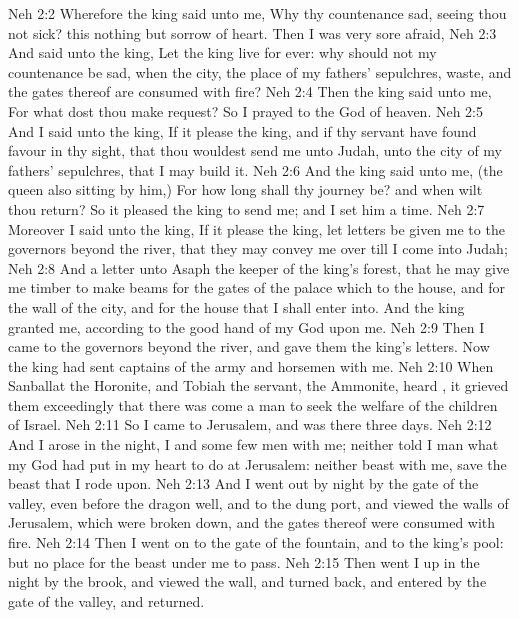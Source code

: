 \vs Neh 2:2 Wherefore the king said unto me, Why  thy countenance sad, seeing thou  not sick? this  nothing  but sorrow of heart. Then I was very sore afraid,
\vs Neh 2:3 And said unto the king, Let the king live for ever: why should not my countenance be sad, when the city, the place of my fathers' sepulchres,  waste, and the gates thereof are consumed with fire?
\vs Neh 2:4 Then the king said unto me, For what dost thou make request? So I prayed to the God of heaven.
\vs Neh 2:5 And I said unto the king, If it please the king, and if thy servant have found favour in thy sight, that thou wouldest send me unto Judah, unto the city of my fathers' sepulchres, that I may build it.
\vs Neh 2:6 And the king said unto me, (the queen also sitting by him,) For how long shall thy journey be? and when wilt thou return? So it pleased the king to send me; and I set him a time.
\vs Neh 2:7 Moreover I said unto the king, If it please the king, let letters be given me to the governors beyond the river, that they may convey me over till I come into Judah;
\vs Neh 2:8 And a letter unto Asaph the keeper of the king's forest, that he may give me timber to make beams for the gates of the palace which  to the house, and for the wall of the city, and for the house that I shall enter into. And the king granted me, according to the good hand of my God upon me.
\vs Neh 2:9 Then I came to the governors beyond the river, and gave them the king's letters. Now the king had sent captains of the army and horsemen with me.
\vs Neh 2:10 When Sanballat the Horonite, and Tobiah the servant, the Ammonite, heard , it grieved them exceedingly that there was come a man to seek the welfare of the children of Israel.
\vs Neh 2:11 So I came to Jerusalem, and was there three days.
\vs Neh 2:12 And I arose in the night, I and some few men with me; neither told I  man what my God had put in my heart to do at Jerusalem: neither  beast with me, save the beast that I rode upon.
\vs Neh 2:13 And I went out by night by the gate of the valley, even before the dragon well, and to the dung port, and viewed the walls of Jerusalem, which were broken down, and the gates thereof were consumed with fire.
\vs Neh 2:14 Then I went on to the gate of the fountain, and to the king's pool: but  no place for the beast  under me to pass.
\vs Neh 2:15 Then went I up in the night by the brook, and viewed the wall, and turned back, and entered by the gate of the valley, and  returned.
